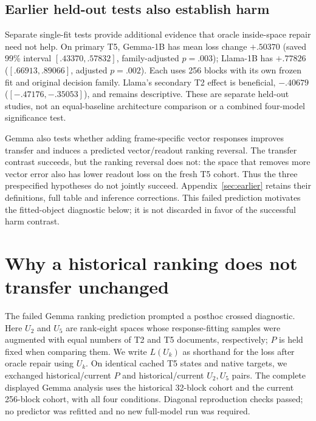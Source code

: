 \subsection{Earlier held-out tests also establish harm}
Separate single-fit tests provide additional evidence that oracle inside-space repair need not help. On primary T5, Gemma-1B has mean loss change $+.50370$ (saved 99\% interval $[.43370,.57832]$, family-adjusted $p=.003$); Llama-1B has $+.77826$ ($[.66913,.89066]$, adjusted $p=.002$). Each uses 256 blocks with its own frozen fit and original decision family. Llama's secondary T2 effect is beneficial, $-.40679$ ($[-.47176,-.35053]$), and remains descriptive. These are separate held-out studies, not an equal-baseline architecture comparison or a combined four-model significance test.

Gemma also tests whether adding frame-specific vector responses improves transfer and induces a predicted vector/readout ranking reversal. The transfer contrast succeeds, but the ranking reversal does not: the space that removes more vector error also has lower readout loss on the fresh T5 cohort. Thus the three prespecified hypotheses do not jointly succeed. Appendix~\ref{sec:earlier} retains their definitions, full table and inference corrections. This failed prediction motivates the fitted-object diagnostic below; it is not discarded in favor of the successful harm contrast.
\section{Why a historical ranking does not transfer unchanged}
The failed Gemma ranking prediction prompted a posthoc crossed diagnostic. Here $U_2$ and $U_5$ are rank-eight spaces whose response-fitting samples were augmented with equal numbers of T2 and T5 documents, respectively; $P$ is held fixed when comparing them. We write $L(U_k)$ as shorthand for the loss after oracle repair using $U_k$. On identical cached T5 states and native targets, we exchanged historical/current $P$ and historical/current $U_2,U_5$ pairs. The complete displayed Gemma analysis uses the historical 32-block cohort and the current 256-block cohort, with all four conditions. Diagonal reproduction checks passed; no predictor was refitted and no new full-model run was required.


